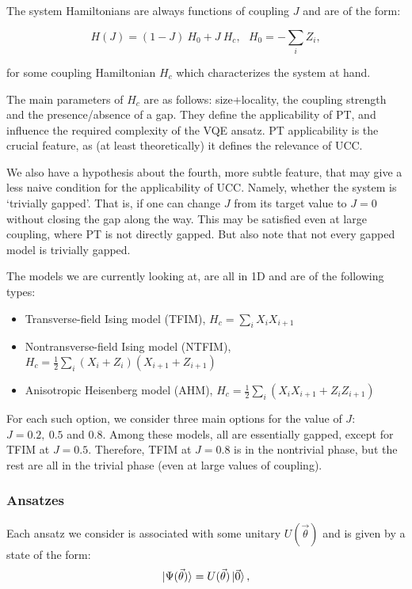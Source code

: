 \documentclass[10pt, a4paper]{article}
\begin{document}
The system Hamiltonians are always functions of coupling $J$ and are of the form:

\begin{equation}
H(J)=(1-J)~H_0+J~H_c,~~~H_0=-\sum_i Z_i,
\end{equation}

for some coupling Hamiltonian $H_c$ which characterizes the system at hand.

The main parameters of $H_c$ are as follows: size+locality, the coupling strength and the presence/absence of a gap. They define the applicability of PT, and influence the required complexity of the VQE ansatz. PT applicability is the crucial feature, as (at least theoretically) it defines the relevance of UCC.

We also have a hypothesis about the fourth, more subtle feature, that may give a less naive condition for the applicability of UCC. Namely, whether the system is `trivially gapped'. That is, if one can change $J$ from its target value to $J=0$ without closing the gap along the way. This may be satisfied even at large coupling, where PT is not directly gapped. But also note that not every gapped model is trivially gapped.

The models we are currently looking at, are all in 1D and are of the following types:
\begin{itemize}
	\item Transverse-field Ising model (TFIM), $H_c=\sum_i X_i X_{i+1}$
	\item Nontransverse-field Ising model (NTFIM), $H_c=\frac{1}{2}\sum_i (X_i+Z_i) (X_{i+1}+Z_{i+1})$
	\item Anisotropic Heisenberg model (AHM),  $H_c=\frac{1}{2}\sum_i (X_iX_{i+1}+Z_iZ_{i+1})$
\end{itemize}

For each such option, we consider three main options for the value of $J$: $J=0.2,~0.5$ and $0.8$. Among these models, all are essentially gapped, except for TFIM at $J=0.5$. Therefore, TFIM at $J=0.8$ is in the nontrivial phase, but the rest are all in the trivial phase (even at large values of coupling).





\subsubsection*{Ansatzes}

 
 
Each ansatz we consider is associated with some unitary $U(\vec{\theta})$ and is given by a state of the form:
\begin{equation*}
\ket{\Psi(\vec{\theta})}=U(\vec{\theta})\ket{\vec{0}},
\end{equation*}
 
\end{document}
